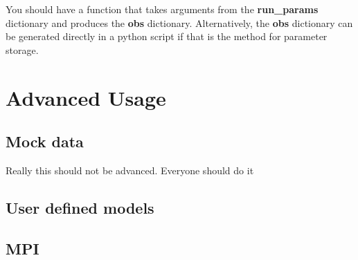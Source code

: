 
You should have a function that takes arguments from the {\bf run_params} dictionary and produces the {\bf obs}  dictionary.  Alternatively, the {\bf obs} dictionary can be generated directly in a python script if that is the method for parameter storage.


\section{Advanced Usage}
\subsection{Mock data}
Really this should not be advanced.  Everyone should do it

\subsection{User defined models}

\subsection{MPI}



